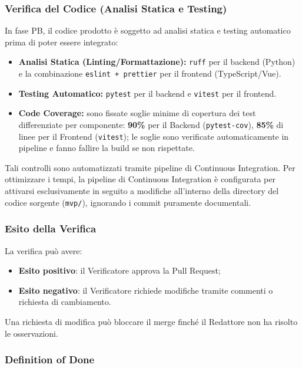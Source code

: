 \subsubsection{Verifica del Codice (Analisi Statica e Testing)}
In fase PB, il codice prodotto è soggetto ad analisi statica e testing automatico prima di poter essere integrato:
\begin{itemize}
    \item \textbf{Analisi Statica (Linting/Formattazione):} \texttt{ruff} per il backend (Python) e la combinazione \texttt{eslint + prettier} per il frontend (TypeScript/Vue).
    \item \textbf{Testing Automatico:} \texttt{pytest} per il backend e \texttt{vitest} per il frontend.
    \item \textbf{Code Coverage:} sono fissate soglie minime di copertura dei test differenziate per componente: \textbf{90\%} per il Backend (\texttt{pytest-cov}), \textbf{85\%} di linee per il Frontend (\texttt{vitest}); le soglie sono verificate automaticamente in pipeline e fanno fallire la build se non rispettate.
\end{itemize}
Tali controlli sono automatizzati tramite pipeline di Continuous Integration. 
Per ottimizzare i tempi, la pipeline di Continuous Integration è configurata per attivarsi esclusivamente in seguito a modifiche all'interno della directory del codice sorgente (\texttt{mvp/}), ignorando i commit puramente documentali.


\subsubsection{Esito della Verifica}

La verifica può avere:

\begin{itemize}
    \item \textbf{Esito positivo}: il Verificatore approva la Pull Request;
    \item \textbf{Esito negativo}: il Verificatore richiede modifiche tramite commenti
    o richiesta di cambiamento.
\end{itemize}

Una richiesta di modifica può bloccare il merge finché il Redattore non ha risolto
le osservazioni.


\subsubsection{Definition of Done}
\label{sec:dod}

